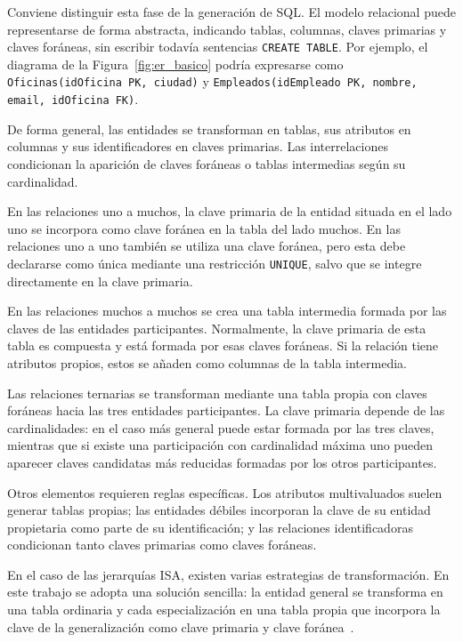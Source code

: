 Conviene distinguir esta fase de la generación de SQL. El modelo relacional puede representarse de forma abstracta, indicando tablas, columnas, claves primarias y claves foráneas, sin escribir todavía sentencias \texttt{CREATE TABLE}. Por ejemplo, el diagrama de la Figura~\ref{fig:er_basico} podría expresarse como \texttt{Oficinas(idOficina PK, ciudad)} y \texttt{Empleados(idEmpleado PK, nombre, email, idOficina FK)}.

De forma general, las entidades se transforman en tablas, sus atributos en columnas y sus identificadores en claves primarias. Las interrelaciones condicionan la aparición de claves foráneas o tablas intermedias según su cardinalidad.

En las relaciones uno a muchos, la clave primaria de la entidad situada en el lado uno se incorpora como clave foránea en la tabla del lado muchos. En las relaciones uno a uno también se utiliza una clave foránea, pero esta debe declararse como única mediante una restricción \texttt{UNIQUE}, salvo que se integre directamente en la clave primaria.

En las relaciones muchos a muchos se crea una tabla intermedia formada por las claves de las entidades participantes. Normalmente, la clave primaria de esta tabla es compuesta y está formada por esas claves foráneas. Si la relación tiene atributos propios, estos se añaden como columnas de la tabla intermedia.

Las relaciones ternarias se transforman mediante una tabla propia con claves foráneas hacia las tres entidades participantes. La clave primaria depende de las cardinalidades: en el caso más general puede estar formada por las tres claves, mientras que si existe una participación con cardinalidad máxima uno pueden aparecer claves candidatas más reducidas formadas por los otros participantes.

Otros elementos requieren reglas específicas. Los atributos multivaluados suelen generar tablas propias; las entidades débiles incorporan la clave de su entidad propietaria como parte de su identificación; y las relaciones identificadoras condicionan tanto claves primarias como claves foráneas.

En el caso de las jerarquías ISA, existen varias estrategias de transformación. En este trabajo se adopta una solución sencilla: la entidad general se transforma en una tabla ordinaria y cada especialización en una tabla propia que incorpora la clave de la generalización como clave primaria y clave foránea~\cite{tema6}.

